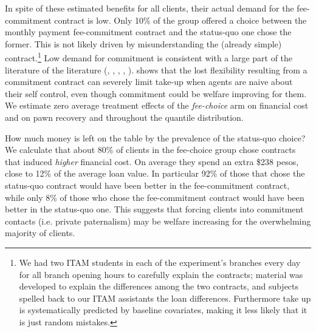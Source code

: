 \documentclass[11pt]{article}
\begin{document}
In spite of these estimated benefits for all clients, their actual demand for the fee-commitment contract is low. Only 10\% of the group offered a choice between the monthly payment fee-commitment contract and the status-quo one chose the former. This is not likely driven by misunderstanding the (already simple) contract.\footnote{We had two ITAM students in each of the experiment's branches every day for all branch opening hours to carefully explain the contracts; material was developed to explain the differences among the two contracts, and subjects spelled back to our ITAM assistants the loan differences. Furthermore take up is systematically predicted by baseline covariates, %
making it less likely that it is just random mistakes.} Low demand for commitment is consistent with a large part of the literature of the literature (\cite{Laibson2015}, \cite{Laibson2018}, \cite{John}, \cite{Ted}, \cite{Rabin2018}).%
\cite{Laibson2015} shows that the lost flexibility resulting from a commitment contract can severely limit take-up when agents are naive about their self control, even though commitment could be welfare improving for them. We estimate zero average treatment effects of the \textit{fee-choice} arm on financial cost and on pawn recovery and throughout the quantile distribution.


How much money is left on the table by the prevalence of the status-quo choice? We calculate that about 80\% of clients in the fee-choice group chose contracts that induced \textit{higher} financial cost. On average they spend an extra \$238 pesos, close to 12\% of the average loan value. In particular 92\% of those that chose the status-quo contract would have been better in the fee-commitment contract, while only 8\% of those who chose the fee-commitment contract would have been better in the status-quo one. This suggests that forcing clients into commitment contacts (i.e. private paternalism) may be welfare increasing for the overwhelming majority of clients.  
\end{document}
